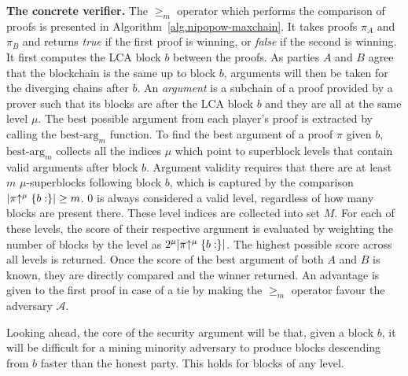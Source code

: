 \noindent
\textbf{The concrete verifier.}
The $\geq_m$ operator which performs the comparison of proofs is presented in
Algorithm~\ref{alg.nipopow-maxchain}. It takes proofs $\pi_A$ and $\pi_B$ and
returns \emph{true} if the first proof is winning, or \emph{false} if the second
is winning. It first computes the LCA block $b$ between the proofs. As parties
$A$ and $B$ agree that the blockchain is the same up to block $b$, arguments
will then be taken for the diverging chains after $b$. An \emph{argument} is a
subchain of a proof provided by a prover such that its blocks are after the LCA
block $b$ and they are all at the same level $\mu$. The best possible argument
from each player's proof is extracted by calling the $\text{best-arg}_m$
function.
To find the best argument of a proof $\pi$ given $b$, $\text{best-arg}_m$
collects all the indices $\mu$ which point to superblock levels that contain
valid arguments after block $b$. Argument validity requires that there are at
least $m$ $\mu$-superblocks following block $b$, which is captured by the
comparison $|\pi\negthickspace\uparrow^\mu\{b:\}| \geq m$. $0$ is always considered a valid
level, regardless of how many blocks are present there. These level indices are
collected into set $M$. For each of these levels, the score of their respective
argument is evaluated by weighting the number of blocks by the level as
$2^\mu|\pi\negthickspace\uparrow^\mu\{b:\}|$. The highest possible score across all levels is
returned. Once the score of the best argument of both $A$ and $B$ is known, they
are directly compared and the winner returned.  An advantage is given to the
first proof in case of a tie by making the $\geq_m$ operator favour the
adversary $\mathcal{A}$.

Looking ahead, the core of the security argument will be that, given a block
$b$, it will be difficult for a mining minority adversary to produce blocks
descending from $b$ faster than the honest party. This holds for blocks of any
level.
